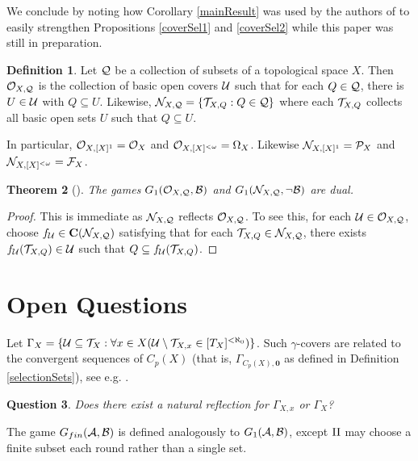 \documentclass{amsart}
\theoremstyle{plain}
\newtheorem{theorem}{Theorem}
\newtheorem{question}[theorem]{Question}
\theoremstyle{definition}
\newtheorem{definition}[theorem]{Definition}
\theoremstyle{remark}
\theoremstyle{plain}
\theoremstyle{definition}
\theoremstyle{remark}
\begin{document}
We conclude by noting how Corollary \ref{mainResult}
was used by the authors of \cite{MR3991109} to
easily strengthen Propositions \ref{coverSel1} and \ref{coverSel2}
while this paper was still in preparation.

\begin{definition}
Let \(\mathcal{Q}\) be a collection of subsets of a topological space \(X\).
Then \(\mathcal{O}_{X,\mathcal{Q}}\) is the collection of basic open covers \(\mathcal{U}\) such that for
each \(Q\in\mathcal{Q}\), there is \(U\in\mathcal{U}\) with \(Q\subseteq U\).
Likewise, \(\mathcal{N}_{X,\mathcal{Q}}=\{\mathcal{T}_{X,Q}:Q\in\mathcal{Q}\}\) where each \(\mathcal{T}_{X,Q}\) collects all
basic open sets \(U\) such that \(Q\subseteq U\). 
\end{definition}

In particular, \(\mathcal{O}_{X,[X]^1}=\mathcal{O}_X\) and \(\mathcal{O}_{X,[X]^{<\omega}}=\Omega_X\).
Likewise \(\mathcal{N}_{X,[X]^1}=\mathcal{P}_X\) and \(\mathcal{N}_{X,[X]^{<\omega}}=\mathcal{F}_X\).

\begin{theorem}[\cite{MR3991109}]
  The games \(G_{1}(\mathcal{O}_{X,\mathcal{Q}},\mathcal{B})\) and
  \(G_{1}(\mathcal{N}_{X,\mathcal{Q}},\neg\mathcal{B})\) are dual.
\end{theorem}

\begin{proof}
  This is immediate as \(\mathcal{N}_{X,\mathcal{Q}}\) reflects \(\mathcal{O}_{X,\mathcal{Q}}\). 
  To see this, for each
  \(\mathcal{U}\in\mathcal{O}_{X,\mathcal{Q}}\), choose \(f_{\mathcal{U}}\in\mathbf C(\mathcal{N}_{X,\mathcal{Q}})\)
  satisfying that for each \(\mathcal{T}_{X,Q}\in\mathcal{N}_{X,\mathcal{Q}}\), there exists
  \(f_{\mathcal{U}}(\mathcal{T}_{X,Q})\in\mathcal{U}\) such that \(Q\subseteq f_{\mathcal{U}}(\mathcal{T}_{X,Q})\).
\end{proof}

\section{Open Questions}

Let 
\(\Gamma_X=\{\mathcal{U}\subseteq\mathcal{T}_X:\forall x\in X(\mathcal{U}\setminus\mathcal{T}_{X,x}\in[T_X]^{<\aleph_0})\}\). 
Such \(\gamma\)-covers are related to the convergent sequences of \(C_p(X)\) (that is,
\(\Gamma_{C_p(X),\mathbf 0}\) as defined in Definition \ref{selectionSets}),
see e.g. \cite{BUKOVSKY2019239}.

\begin{question}
  Does there exist a natural reflection for \(\Gamma_{X,x}\)
  or \(\Gamma_X\)?
\end{question} 

The game \(G_{fin}(\mathcal{A},\mathcal{B})\) is defined analogously to
\(G_{1}(\mathcal{A},\mathcal{B})\), except \(\mathrm{II}\) may choose a finite subset each round
rather than a single set.
\end{document}
